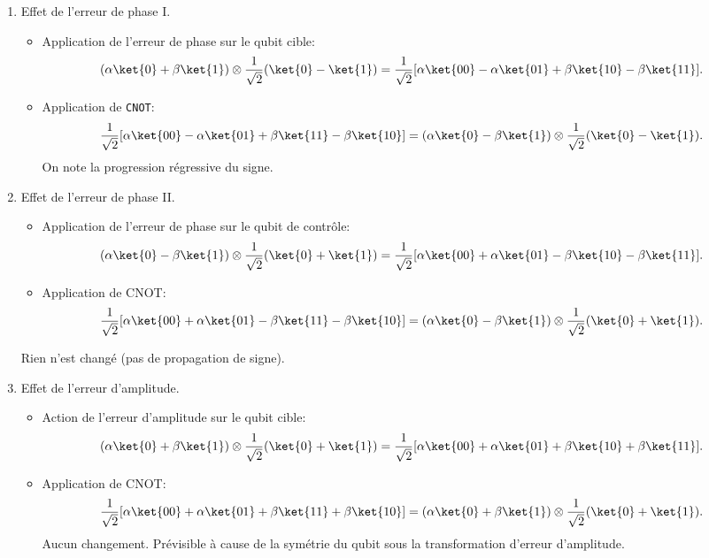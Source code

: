 \begin{enumerate}
\item Effet de l'erreur de phase I.
\begin{itemize}
\item Application de l'erreur de phase sur le qubit cible:
\begin{equation}
(\alpha\ket{0} +\beta\ket{1})\otimes\frac{1}{\sqrt{2}}( \ket{0}-\ket{1})
=\frac{1}{\sqrt{2}}[\alpha\ket{00}-\alpha\ket{01}+\beta\ket{10}-\beta\ket{11}].
\end{equation}
\item Application de \texttt{CNOT}:
\begin{equation}
\frac{1}{\sqrt{2}}[\alpha\ket{00}-\alpha\ket{01}+\beta\ket{11}-\beta\ket{10}]
=(\alpha\ket{0}-\beta\ket{1})\otimes\frac{1}{\sqrt{2}}(\ket{0}-\ket{1}).
\end{equation}
On note la progression régressive du signe.
\end{itemize}

\item Effet de l'erreur de phase II.

\begin{itemize}
\item Application de l'erreur de phase sur le qubit de contrôle:
\begin{equation}
(\alpha\ket{0} -\beta\ket{1})\otimes\frac{1}{\sqrt{2}}(\ket{0}+\ket{1})
=\frac{1}{\sqrt{2}}[\alpha\ket{00}+\alpha\ket{01}-\beta\ket{10}-\beta\ket{11}].
\end{equation}
\item Application de CNOT:
\begin{equation}
\frac{1}{\sqrt{2}}[\alpha\ket{00}+\alpha\ket{01}-\beta\ket{11}-\beta\ket{10}]
=(\alpha\ket{0}-\beta\ket{1})\otimes\frac{1}{\sqrt{2}}(\ket{0} +\ket{1}).
\end{equation}
\end{itemize}
Rien n'est changé (pas de propagation de signe).

\item Effet de l'erreur d'amplitude.
\begin{itemize}
\item Action de l'erreur d'amplitude sur le qubit cible:
\begin{equation}
(\alpha\ket{0} +\beta\ket{1})\otimes\frac{1}{\sqrt{2}}(\ket{0}+\ket{1})
=\frac{1}{\sqrt{2}}[\alpha\ket{00}+\alpha\ket{01}+\beta\ket{10}+\beta\ket{11}].
\end{equation}

\item Application de CNOT:
\begin{equation}
\frac{1}{\sqrt{2}}[\alpha\ket{00}+\alpha\ket{01}+\beta\ket{11}+\beta\ket{10}]
=(\alpha\ket{0}+\beta\ket{1})\otimes\frac{1}{\sqrt{2}}(\ket{0}+\ket{1}).
\end{equation}
Aucun changement. Prévisible à cause de la symétrie du qubit sous la
transformation d'erreur d'amplitude.


\end{itemize}
\end{enumerate}

